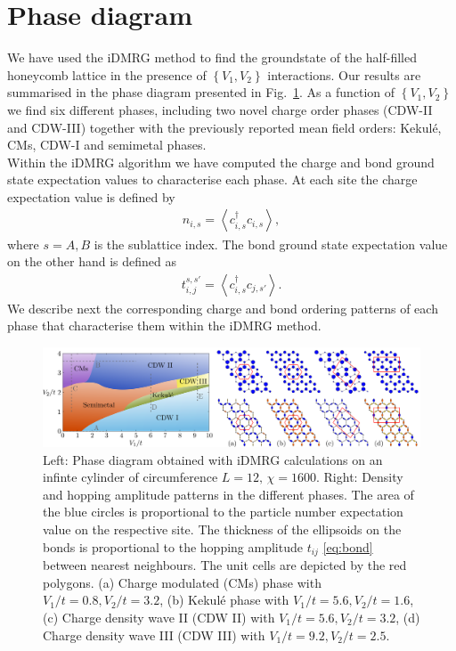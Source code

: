 \documentclass[aps,prx,10pt,twocolumn,floatfix,superscriptaddress,showpacs,numerical,footinbib]{revtex4-1}
\begin{document}
\section{\label{sec:phasediagram}Phase diagram}
%
We have used the iDMRG method to find the groundstate of the half-filled honeycomb lattice in the presence of 
$\left\lbrace V_{1},V_{2}\right\rbrace$ interactions.
%
Our results are summarised in the phase diagram presented in Fig.~\ref{fig:phase diagram}.
%
As a function of $\left\lbrace V_{1},V_{2}\right\rbrace$ we find six different phases, 
including two novel charge order phases (CDW-II and CDW-III) together with the previously 
reported mean field orders: Kekul\'{e}, CMs, CDW-I and semimetal phases.\\
%
%
Within the iDMRG algorithm we have computed the charge and bond ground state expectation values
to characterise each phase.
%
At each site the charge expectation value is defined by 
%
\begin{eqnarray}
\label{eq:charge}
n_{i,s}=\left\langle c^{\dagger}_{i,s}c_{i,s}\right\rangle,  
\end{eqnarray}
%
where $s=A,B$ is the sublattice index. 
%
The bond ground state expectation value on the other hand is defined as
%
\begin{eqnarray}
\label{eq:bond}
t^{s,s'}_{i,j}=\left\langle c^{\dagger}_{i,s}c_{j,s'}\right\rangle.
\end{eqnarray}
%
%
We describe next the corresponding charge and bond ordering patterns of each phase 
that characterise them within the iDMRG method.

\begin{figure}
 \includegraphics[width=\textwidth]{pdf/phase_diagram_ext.pdf}
 \caption{Left: Phase diagram obtained with iDMRG calculations on an infinte cylinder of circumference $L=12, \, \chi = 1600$. 
 Right: Density and hopping amplitude patterns in the different phases. 
 The area of the blue circles is proportional to the particle number expectation value on the respective site. 
 The thickness of the ellipsoids on the bonds is proportional to the hopping amplitude $t_{ij}$ \eqref{eq:bond} between nearest neighbours.
 The unit cells are depicted by the red polygons. 
 (a) Charge modulated (CMs) phase with $V_1/t = 0.8, V_2/t = 3.2 $, (b) Kekul\'e phase with $V_1/t = 5.6, V_2/t = 1.6 $, (c) Charge density wave II (CDW II) with $V_1/t = 5.6, V_2/t = 3.2$,  (d) Charge density wave III (CDW III) with $V_1/t = 9.2, V_2/t = 2.5$. 
 \label{fig:phase diagram}}
\end{figure}
\end{document}
